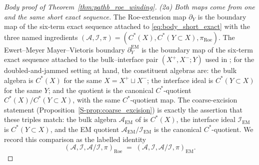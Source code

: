 \documentclass[11pt]{article}
\numberwithin{equation}{section}
\theoremstyle{definition}
\theoremstyle{remark}
\begin{document}
\begin{proof}[Body proof of Theorem~\ref{thm:pathb_roe_winding}]
\smallskip
\emph{(2a) Both maps come from one and the same short exact sequence.} The Roe-extension map
\(\partial_Y\) is the boundary map of the six-term exact sequence attached to
\eqref{eq:body_short_exact} with the three named ingredients
\((\mathcal A,\mathcal I,\pi)=(C^*(X),C^*(Y\subset X),\pi_{\mathrm{Roe}})\). The Ewert--Meyer
Mayer--Vietoris boundary \(\partial^{\mathrm{EM}}_Y\) is the boundary map of the six-term exact
sequence attached to the bulk--interface pair
\((X^+,X^-;Y)\) used in \cite{EwertMeyer2019}; for the doubled-and-jammed setting at hand, the
constituent algebras are: the bulk algebra is \(C^*(X)\) for the same \(X=X^+\sqcup X^-\); the
interface ideal is \(C^*(Y\subset X)\) for the same \(Y\); and the quotient is the canonical
\(C^*\)-quotient \(C^*(X)/C^*(Y\subset X)\), with the same \(C^*\)-quotient map. The
coarse-excision statement (Proposition~\ref{S-prop:coarse_excision}) is exactly the assertion
that these triples match: the bulk algebra \(\mathcal A_{\mathrm{EM}}\) of \cite{EwertMeyer2019}
is \(C^*(X)\), the interface ideal \(\mathcal I_{\mathrm{EM}}\) is \(C^*(Y\subset X)\), and
the EM quotient \(\mathcal A_{\mathrm{EM}}/\mathcal I_{\mathrm{EM}}\) is the canonical
\(C^*\)-quotient. We record this comparison as the labelled identity
\begin{equation}\label{eq:body_step2_algebras}
(\mathcal A,\mathcal I,\mathcal A/\mathcal I,\pi)_{\mathrm{Roe}}
\;=\;
(\mathcal A,\mathcal I,\mathcal A/\mathcal I,\pi)_{\mathrm{EM}}.
\end{equation}


\end{proof}
\end{document}

